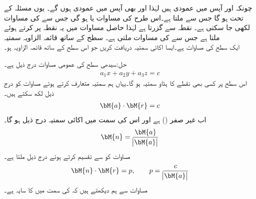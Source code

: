 چونکہ  اور  آپس میں عمودی ہیں لہٰذا  اور  بھی آپس میں عمودی ہوں گے۔ یوں مسئلہ  کے تحت   ہو گا جس سے  ملتا ہے۔اس طرح  کی مساوات  یا  ہو گی جس سے  کی مساوات  لکھی جا سکتی ہے۔  نقطہ  سے گزرتا ہے لہٰذا حاصل مساوات میں یہ نقطہ پر کرتے ہوئے  ملتا ہے جس سے  کی مساوات  ملتی ہے۔
\quad سطح کے ساتھ قائمہ الزاویہ سمتیہ\\
ایک سطح کی مساوات  ہے۔ایسا اکائی سمتیہ دریافت کریں جو اس سطح کے ساتھ قائمہ الزاویہ ہو۔

حل:سیدھی سطح کی عمومی مساوات درج ذیل ہے۔
\begin{align}\label{مساوات_الجبرا_سیدھی_سطح_الف}
a_1x+a_2y+a_3z=c
\end{align} 
اس سطح پر کسی بھی نقطے کا ہٹاو سمتیہ  ہو گا۔یہاں ہم سمتیہ  متعارف کرتے ہوئے  مساوات  کو درج ذیل لکھ سکتے ہیں۔
\begin{align}\label{مساوات_الجبرا_سیدھی_سطح_ب}
\bM{a}\cdot\bM{r}=c
\end{align}
اب   غیر صفر () ہے اور اس کی سمت میں اکائی سمتیہ  درج ذیل ہو گا۔
\begin{align*}
\bM{n}=\frac{\bM{a}}{\abs{\bM{a}}}
\end{align*}
مساوات  کو  سے تقسیم کرتے ہوئے درج ذیل ملتا ہے۔
\begin{align}
\bM{n}\cdot \bM{r}=p,\quad \quad  p=\frac{c}{\abs{\bM{a}}}
\end{align}
مساوات  سے ہم دیکھتے ہیں کہ  کی سمت میں  کا سایہ  ہے۔

